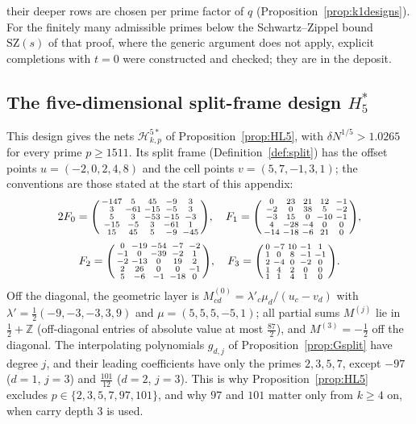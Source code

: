 \documentclass[11pt]{amsart}
\theoremstyle{definition}
\theoremstyle{plain}
\newcommand{\Z}{\mathbb{Z}}
\begin{document}
their deeper rows are chosen per prime factor of $q$ (Proposition~\ref{prop:k1designs}). For the finitely many admissible primes below the Schwartz--Zippel bound $\mathrm{SZ}(s)$ of that proof, where the generic argument does not apply, explicit completions with $t=0$ were constructed and checked; they are in the deposit.

\subsection{The five-dimensional split-frame design \texorpdfstring{$H_5^*$}{H5*}}
This design gives the nets $\mathcal H^{5*}_{k,p}$ of Proposition~\ref{prop:HL5}, with $\delta N^{1/5}>1.0265$ for every prime $p\ge1511$. Its split frame (Definition~\ref{def:split}) has the offset points $u=(-2,0,2,4,8)$ and the cell points $v=(5,7,-1,3,1)$; the conventions are those stated at the start of this appendix:
\[
2F_0=\begin{psmallmatrix}-147&5&45&-9&3\\3&-61&-15&-5&3\\5&3&-53&-15&-3\\-15&-5&3&-61&1\\15&45&5&-9&-45\end{psmallmatrix},\quad
F_1=\begin{psmallmatrix}0&23&21&12&-1\\-2&0&38&5&-2\\-3&15&0&-10&-1\\4&-28&-4&0&0\\-14&-18&-6&21&0\end{psmallmatrix},
\]
\[
F_2=\begin{psmallmatrix}0&-19&-54&-7&-2\\-1&0&-39&-2&1\\-2&-13&0&19&2\\2&26&0&0&-1\\5&-6&-1&-18&0\end{psmallmatrix},\quad
F_3=\begin{psmallmatrix}0&-7&10&-1&1\\1&0&8&-1&-1\\2&-4&0&-2&0\\1&4&2&0&0\\1&1&4&1&0\end{psmallmatrix}.
\]
Off the diagonal, the geometric layer is $M^{(0)}_{cd}=\lambda'_c\mu_d/(u_c-v_d)$ with $\lambda'=\frac12(-9,-3,-3,3,9)$ and $\mu=(5,5,5,-5,1)$; all partial sums $M^{(j)}$ lie in $\frac12+\Z$ (off-diagonal entries of absolute value at most $\frac{87}2$), and $M^{(3)}=-\frac12$ off the diagonal. The interpolating polynomials $g_{d,j}$ of Proposition~\ref{prop:Gsplit} have degree $j$, and their leading coefficients have only the primes $2,3,5,7$, except $-97$ ($d=1$, $j=3$) and $\frac{101}{12}$ ($d=2$, $j=3$). This is why Proposition~\ref{prop:HL5} excludes $p\in\{2,3,5,7,97,101\}$, and why $97$ and $101$ matter only from $k\ge4$ on, when carry depth $3$ is used.
\end{document}
